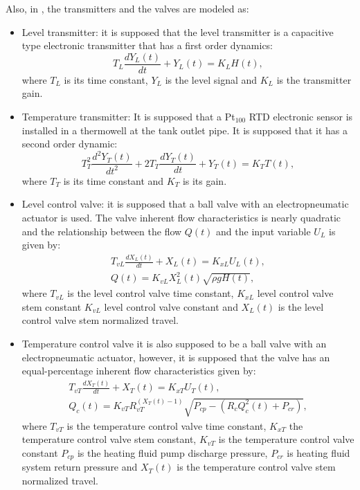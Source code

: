 Also, in \citet{Alfaro2016}, the transmitters and the valves are modeled as:
\begin{itemize}
	\item Level transmitter: it is supposed that the level transmitter is a capacitive type electronic transmitter that has a first order dynamics:
		\begin{equation*}
			T_L \frac{d Y_L(t)}{dt} + Y_L(t) = K_L H(t),
		\end{equation*}
		where $T_L$ is its time constant, $Y_L$ is the level signal and $K_L$ is the transmitter gain.
	\item Temperature transmitter: It is supposed that a Pt$_{100}$ RTD electronic sensor is installed in a thermowell at the tank outlet pipe. It is supposed that it has a second order dynamic:
		\begin{equation*}
			T_{T}^2 \frac{d^2 Y_T(t)}{dt^2} + 2T_T \frac{d Y_T(t)}{dt} + Y_T(t) = K_T T(t),
		\end{equation*}
		where $T_T$ is its time constant and $K_T$ is its gain.
	\item Level control valve: it is supposed that a ball valve with an electropneumatic actuator is used. The valve	inherent flow characteristics is nearly quadratic and the relationship between the flow $Q(t)$ and the input variable $U_L$ is given by:
		\begin{align*}
			T_{vL} \frac{d X_L(t)}{dt} + X_L(t) = K_{xL} U_L(t),\\
			Q(t) = K_{vL} X_L^2(t)\sqrt{\rho g H(t)},
		\end{align*}
		where $T_{vL}$ is the level control valve time constant, $K_{xL}$ level control valve stem constant $K_{vL}$ level control valve constant and $X_L(t)$ is the level control valve stem normalized travel.
	\item Temperature control valve it is also supposed to be a ball valve with an electropneumatic actuator, however, it is supposed that the valve has an equal-percentage inherent flow characteristics given by:
		\begin{align*}
			T_{vT} \frac{d X_T(t)}{dt} + X_T(t) = K_{xT} U_T(t),\\
			Q_c(t) = K_{vT}R_{vT}^{\left( X_T(t) -1 \right) } \sqrt{P_{cp} - \left(R_c Q^2_c(t)+P_{cr} \right) },
		\end{align*}
		where $T_{vT}$ is the temperature control valve time constant, $K_{xT}$ the temperature control valve stem constant, $K_{vT}$ is the temperature control valve constant $P_{cp}$ is the heating fluid pump discharge pressure, $P_{cr}$ is heating fluid system return pressure and $X_T(t)$ is the temperature control valve stem normalized travel.
\end{itemize}

